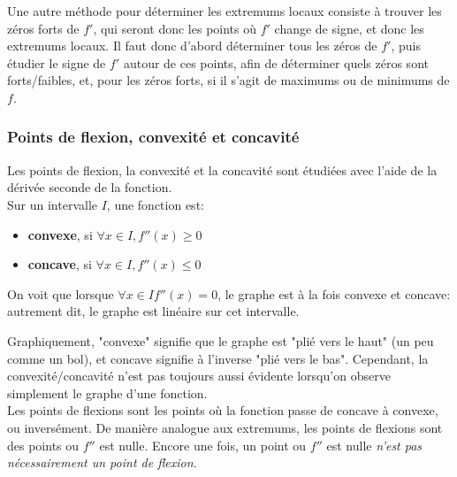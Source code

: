 \documentclass{article}
\numberwithin{equation}{section}
\begin{document}
Une autre méthode pour déterminer les extremums locaux consiste à trouver les zéros forts de \(f'\), qui seront donc les points où \(f'\) change de signe, et donc les extremums locaux. Il faut donc d'abord déterminer tous les zéros de \(f'\), puis étudier le signe de \(f'\) autour de ces points, afin de déterminer quels zéros sont forts/faibles, et, pour les zéros forts, si il s'agit de maximums ou de minimums de \(f\).

\subsubsection{Points de flexion, convexité et concavité}
Les points de flexion, la convexité et la concavité sont étudiées avec l'aide de la dérivée seconde de la fonction. \\

Sur un intervalle \(I\), une fonction est:
\begin{itemize}
	\item \textbf{convexe}, si \(\forall x \in I, f''(x) \geq 0\)
	\item \textbf{concave}, si \(\forall x \in I, f''(x) \leq 0\)
\end{itemize}
On voit que lorsque \(\forall x \in I f''(x) = 0\), le graphe est à la fois convexe et concave: autrement dit, le graphe est linéaire sur cet intervalle.

Graphiquement, "convexe" signifie que le graphe est "plié vers le haut" (un peu comme un bol), et concave signifie à l'inverse "plié vers le bas". Cependant, la convexité/concavité n'est pas toujours aussi évidente lorsqu'on observe simplement le graphe d'une fonction. \\

Les points de flexions sont les points où la fonction passe de concave à convexe, ou inversément. De manière analogue aux extremums, les points de flexions sont des points ou \(f''\) est nulle. Encore une fois, un point ou \(f''\) est nulle \emph{n'est pas nécessairement un point de flexion}. \\
\end{document}
